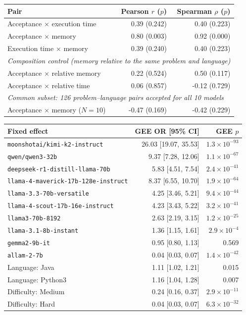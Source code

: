 \begin{tabular}{lrr}
\hline
\textbf{Pair} & \textbf{Pearson $r$ ($p$)} & \textbf{Spearman $\rho$ ($p$)} \\
\hline
Acceptance $\times$ execution time & 0.39 (0.242) & 0.40 (0.223) \\
Acceptance $\times$ memory & 0.80 (0.003) & 0.92 (0.000) \\
Execution time $\times$ memory & 0.39 (0.240) & 0.40 (0.223) \\
\hline
\multicolumn{3}{l}{\emph{Composition control (memory relative to the same problem and language)}} \\
Acceptance $\times$ relative memory & 0.22 (0.524) & 0.50 (0.117) \\
Acceptance $\times$ relative time & 0.06 (0.857) & -0.12 (0.729) \\
\multicolumn{3}{l}{\emph{Common subset: 126 problem--language pairs accepted for all 10 models}} \\
Acceptance $\times$ memory ($N=10$) & -0.47 (0.169) & -0.42 (0.229) \\
\hline
\end{tabular}

\begin{tabular}{lrr}
\hline
\textbf{Fixed effect} & \textbf{GEE OR [95\% CI]} & \textbf{GEE $p$} \\
\hline
\texttt{moonshotai/kimi-k2-instruct} & 26.03 [19.07, 35.53] & $1.3\times10^{-93}$ \\
\texttt{qwen/qwen3-32b} & 9.37 [7.28, 12.06] & $1.1\times10^{-67}$ \\
\texttt{deepseek-r1-distill-llama-70b} & 5.83 [4.51, 7.54] & $2.4\times10^{-41}$ \\
\texttt{llama-4-maverick-17b-128e-instruct} & 8.37 [6.55, 10.70] & $1.9\times10^{-64}$ \\
\texttt{llama-3.3-70b-versatile} & 4.25 [3.46, 5.21] & $9.4\times10^{-44}$ \\
\texttt{llama-4-scout-17b-16e-instruct} & 4.23 [3.43, 5.22] & $3.2\times10^{-41}$ \\
\texttt{llama3-70b-8192} & 2.63 [2.19, 3.15] & $1.2\times10^{-25}$ \\
\texttt{llama-3.1-8b-instant} & 1.36 [1.15, 1.61] & $2.9\times10^{-4}$ \\
\texttt{gemma2-9b-it} & 0.95 [0.80, 1.13] & 0.569 \\
\texttt{allam-2-7b} & 0.04 [0.03, 0.07] & $1.4\times10^{-42}$ \\
Language: Java & 1.11 [1.02, 1.21] & 0.015 \\
Language: Python3 & 1.16 [1.04, 1.28] & 0.007 \\
Difficulty: Medium & 0.24 [0.16, 0.37] & $2.9\times10^{-11}$ \\
Difficulty: Hard & 0.04 [0.03, 0.07] & $6.3\times10^{-32}$ \\
\hline
\end{tabular}

